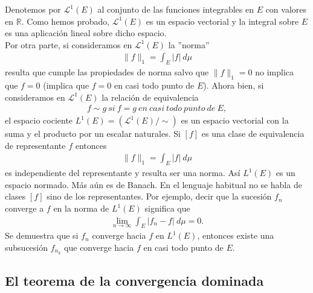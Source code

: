 \begin{obs}
Denotemos por $\mathcal{L}^1(E)$ al conjunto de las funciones integrables en $E$ con valores en $\mathbb{R}$. Como hemos probado, $\mathcal{L}^1(E)$ es un espacio vectorial y la integral sobre $E$ es una aplicación lineal sobre dicho espacio.
\\
\newline
Por otra parte, si consideramos en $\mathcal{L}^1(E)$ la ''norma''
\begin{align*}
    \|f\|_1 = \int_{E}{|f| \ d\mu}
\end{align*}
resulta que cumple las propiedades de norma salvo que $\|f\|_1 = 0$ no implica que $f = 0$ (implica que $f = 0$ en casi todo punto de $E$). Ahora bien, si consideramos en $\mathcal{L}^1(E)$ la relación de equivalencia
\begin{align*}
    f \sim g \ si \ f = g \ en \ casi \ todo \ punto \ de \ E,
\end{align*}
el espacio cociente $L^1(E) = (\mathcal{L}^1(E)/\sim)$ es un espacio vectorial con la suma y el producto por un escalar naturales. Si $[f]$ es una clase de equivalencia de representante $f$ entonces
\begin{align*}
    \|f\|_1 = \int_{E}{|f| \ d\mu}
\end{align*}
es independiente del representante y resulta ser una norma. Así $L^1(E)$ es un espacio normado. Más aún es de Banach. En el lenguaje habitual no se habla de clases $[f]$ sino de los representantes. Por ejemplo, decir que la sucesión $f_n$ converge a $f$ en la norma de $L^1(E)$ significa que
\begin{align*}
    \lim_{n \to \infty}{\int_{E}{|f_n - f|} \ d\mu} = 0.
\end{align*}
Se demuestra que si $f_n$ converge hacia $f$ en $L^1(E)$, entonces existe una subsucesión $f_{n_k}$ que converge hacia $f$ en casi todo punto de $E$.
\end{obs}

\subsection{El teorema de la convergencia dominada}

